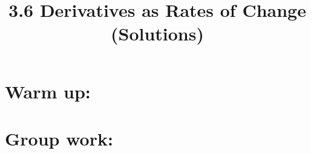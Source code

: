\documentclass[nooutcomes]{ximera}
\title{3.6 Derivatives as Rates of Change (Solutions)}
\begin{document}
\begin{abstract}		\end{abstract}
\maketitle

\section*{Warm up:} 

	\begin{freeResponse}
	
	\end{freeResponse}	
	
	
	
	
	

\section*{Group work:}



\begin{problem}
		\begin{freeResponse}
		
		\end{freeResponse}
			
			
	
\end{problem}
















\begin{problem}

			\begin{freeResponse}
			
			\end{freeResponse}
			
			
			
		
\end{problem}
	
	
	
	
	
	
	
	
			
			

\begin{problem}

		\begin{freeResponse}
		
		\end{freeResponse}
		
		
		
	
		
\end{problem}
\end{document}
